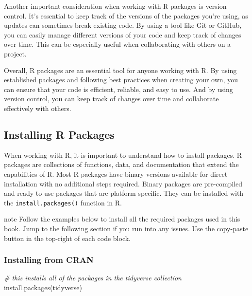 \documentclass[
]{book}
\newenvironment{Shaded}{\begin{snugshade}}{\end{snugshade}}
\newcommand{\CommentTok}[1]{\textcolor[rgb]{0.56,0.35,0.01}{\textit{#1}}}
\newcommand{\FunctionTok}[1]{\textcolor[rgb]{0.00,0.00,0.00}{#1}}
\newcommand{\NormalTok}[1]{#1}
\newcommand{\StringTok}[1]{\textcolor[rgb]{0.31,0.60,0.02}{#1}}
\begin{document}
Another important consideration when working with R packages is version control. It's essential to keep track of the versions of the packages you're using, as updates can sometimes break existing code. By using a tool like Git or GitHub, you can easily manage different versions of your code and keep track of changes over time. This can be especially useful when collaborating with others on a project.

Overall, R packages are an essential tool for anyone working with R. By using established packages and following best practices when creating your own, you can ensure that your code is efficient, reliable, and easy to use. And by using version control, you can keep track of changes over time and collaborate effectively with others.

\hypertarget{installing-r-packages}{%
\subsection{Installing R Packages}\label{installing-r-packages}}

When working with R, it is important to understand how to install packages. R packages are collections of functions, data, and documentation that extend the capabilities of R. Most R packages have binary versions available for direct installation with no additional steps required. Binary packages are pre-compiled and ready-to-use packages that are platform-specific. They can be installed with the \texttt{install.packages()} function in R.

\begin{infobox}{note}
Follow the examples below to install all the required packages used in this book. Jump to the following section if you run into any issues. Use the copy-paste button in the top-right of each code block.

\end{infobox}

\hypertarget{installing-from-cran}{%
\subsubsection*{Installing from CRAN}\label{installing-from-cran}}

\begin{Shaded}
\begin{Highlighting}[]
\CommentTok{\# this installs all of the packages in the tidyverse collection}
\FunctionTok{install.packages}\NormalTok{(}\StringTok{\textquotesingle{}tidyverse\textquotesingle{}}\NormalTok{)}
\end{Highlighting}
\end{Shaded}
\end{document}
